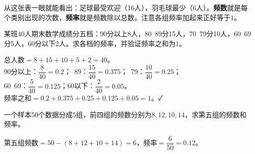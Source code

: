 \begin{center}
\end{center}

从这张表一眼就能看出：足球最受欢迎（16人），羽毛球最少（6人）。\textbf{频数}就是每个类别出现的次数，\textbf{频率}就是频数除以总数。注意各组频率加起来正好等于$1$。


\begin{example}
某班$40$人期末数学成绩分五档：90分以上8人，80~89分15人，70~79分10人，60~69分5人，60分以下2人。求各档的频率，并验证频率之和为$1$。
\end{example}
\begin{solution}
总人数$=8+15+10+5+2=40$。\\
90分以上：$\dfrac{8}{40}=0.2$；~89：$\dfrac{15}{40}=0.375$；~79：$\dfrac{10}{40}=0.25$；\\
60~69：$\dfrac{5}{40}=0.125$；\quad 60以下：$\dfrac{2}{40}=0.05$。\\
频率之和$=0.2+0.375+0.25+0.125+0.05=1$。✓
\end{solution}

\begin{example}
一个样本$50$个数据分成$5$组，前四组的频数分别为$8,12,10,14$，求第五组的频数和频率。
\end{example}
\begin{solution}
第五组频数$=50-(8+12+10+14)=6$，频率$=\dfrac{6}{50}=0.12$。
\end{solution}

